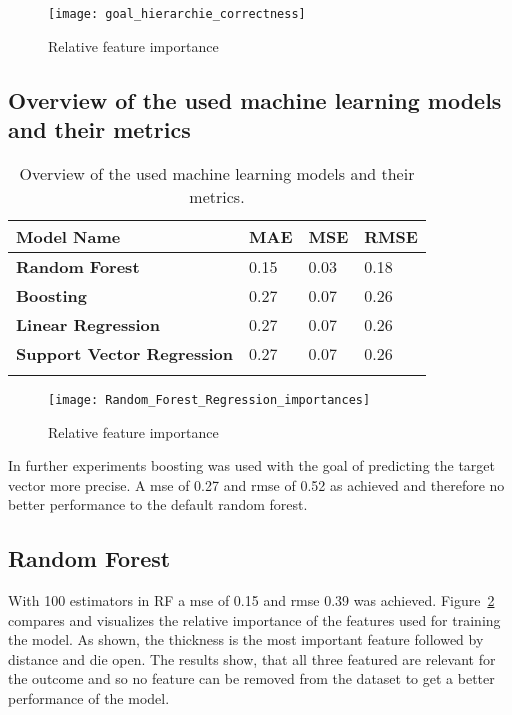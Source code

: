 \begin{figure}[H]
    \centering
    \texttt{[image: goal\_hierarchie\_correctness]}
    \caption{Relative feature importance}
    \label{fig:goal_hierarchie_correctness}
\end{figure}


\subsection{Overview of the used machine learning models and their metrics}
\begin{longtable}{l|l|l|l}
    \textbf{Model Name} & \textbf{MAE} & \textbf{MSE} & \textbf{RMSE} \\
    \hline
    \textbf{Random Forest} & 0.15 & 0.03 & 0.18 \\
    \hline
    \textbf{Boosting} & 0.27 & 0.07 & 0.26 \\
    \hline
    \textbf{Linear Regression} & 0.27 & 0.07 & 0.26 \\
    \hline
    \textbf{Support Vector Regression} & 0.27 & 0.07 & 0.26 \\
    \hline
    \caption{Overview of the used machine learning models and their metrics.}
    \label{tab:ml_models}
\end{longtable}







\begin{figure}[H]
    \centering
    \texttt{[image: Random\_Forest\_Regression\_importances]}
    \caption{Relative feature importance}
    \label{fig:rf_feature_importance}
\end{figure}

In further experiments boosting was used with the goal of predicting the target vector more precise. A \ac{mse} of 0.27 and \ac{rmse} of 0.52 as achieved and therefore no better performance to the default random forest.


\subsection{Random Forest}
With 100 estimators in \ac{RF} a \ac{mse} of 0.15 and \ac{rmse} 0.39 was achieved.
Figure~\ref{fig:rf_feature_importance} compares and visualizes the relative importance of the features used for training the model.
As shown, the thickness is the most important feature followed by distance and die open. The results show, that all three featured are relevant for the outcome and so no feature can be removed from the dataset to get a better performance of the model.


